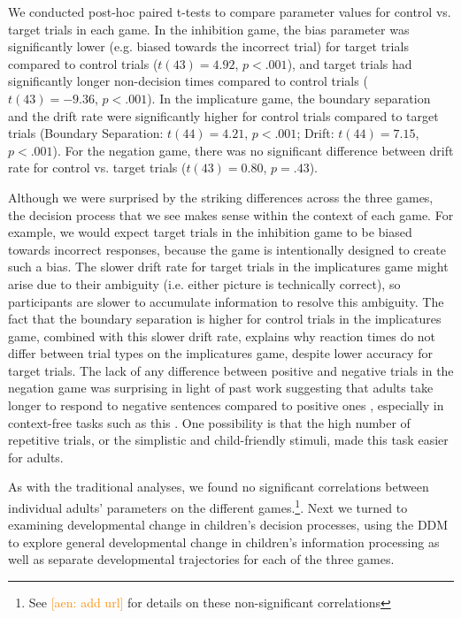 \documentclass[10pt,letterpaper]{article}
\newcommand{\aen}[1]{\textcolor{DarkOrange}{[aen: #1]}}
\begin{document}
We conducted post-hoc paired t-tests to compare parameter values for control vs. target trials in each game.  In the inhibition game, the bias parameter was significantly lower (e.g. biased towards the incorrect trial) for target trials compared to control trials ($t(43) = 4.92$, $p< .001$), and target trials had significantly longer non-decision times compared to control trials ($t(43) = -9.36$, $p< .001$).  In the implicature game, the boundary separation and the drift rate were significantly higher for control trials compared to target trials (Boundary Separation: $t(44) = 4.21$, $p< .001$; Drift: $t(44) = 7.15$, $p< .001$).  For the negation game, there was no significant difference between drift rate for control vs. target trials ($t(43) = 0.80$, $p = .43$).  

Although we were surprised by the striking differences across the three games, the decision process that we see makes sense within the context of each game.  For example, we would expect target trials in the inhibition game to be biased towards incorrect responses, because the game is intentionally designed to create such a bias.  The slower drift rate for target trials in the implicatures game might arise due to their ambiguity (i.e. either picture is technically correct), so participants are slower to accumulate information to resolve this ambiguity. The fact that the boundary separation is higher for control trials in the implicatures game, combined with this slower drift rate, explains why reaction times do not differ between trial types on the implicatures game, despite lower accuracy for target trials.  The lack of any difference between positive and negative trials in the negation game was surprising in light of past work suggesting that adults take longer to respond to negative sentences compared to positive ones \cite{hclark1972}, especially in context-free tasks such as this \cite{nordmeyer2014a}.  One possibility is that the high number of repetitive trials, or the simplistic and child-friendly stimuli, made this task easier for adults.

As with the traditional analyses, we found no significant correlations between individual adults' parameters on the different games.\footnote{See \aen{add url} for details on these non-significant correlations}. Next we turned to examining developmental change in children's decision processes, using the DDM to explore general developmental change in children's information processing as well as separate developmental trajectories for each of the three games.
\end{document}
